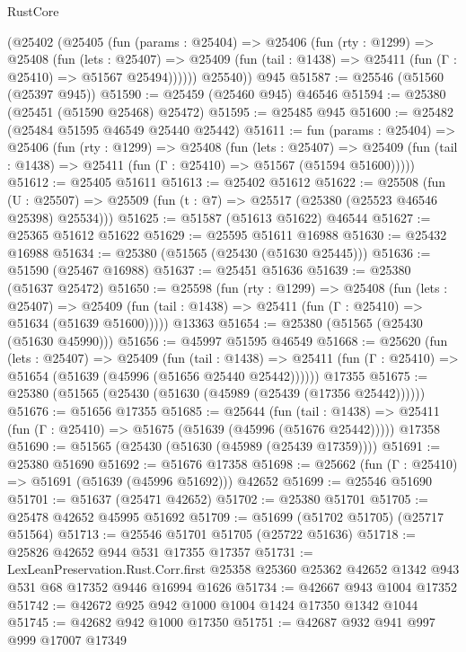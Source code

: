 \begin{lexlean}{RustCore}
\begin{coremodule}
      (@25402
        (@25405
          (fun (params : @25404) =>
          @25406
            (fun (rty : @1299) =>
            @25408
              (fun (lets : @25407) =>
              @25409 (fun (tail : @1438) => @25411 (fun (Γ : @25410) => @51567 @25494))))))
        @25540))
    @945
@51587 := @25546 (@51560 (@25397 @945))
@51590 := @25459 (@25460 @945) @46546
@51594 := @25380 (@25451 (@51590 @25468) @25472)
@51595 := @25485 @945
@51600 := @25482 (@25484 @51595 @46549 @25440 @25442)
@51611 := fun (params : @25404) =>
  @25406
    (fun (rty : @1299) =>
    @25408
      (fun (lets : @25407) =>
      @25409 (fun (tail : @1438) => @25411 (fun (Γ : @25410) => @51567 (@51594 @51600)))))
@51612 := @25405 @51611
@51613 := @25402 @51612
@51622 := @25508
    (fun (U : @25507) => @25509 (fun (t : @7) => @25517 (@25380 (@25523 @46546 @25398) @25534)))
@51625 := @51587 (@51613 @51622) @46544
@51627 := @25365 @51612 @51622
@51629 := @25595 @51611 @16988
@51630 := @25432 @16988
@51634 := @25380 (@51565 (@25430 (@51630 @25445)))
@51636 := @51590 (@25467 @16988)
@51637 := @25451 @51636
@51639 := @25380 (@51637 @25472)
@51650 := @25598
    (fun (rty : @1299) =>
    @25408
      (fun (lets : @25407) =>
      @25409 (fun (tail : @1438) => @25411 (fun (Γ : @25410) => @51634 (@51639 @51600)))))
    @13363
@51654 := @25380 (@51565 (@25430 (@51630 @45990)))
@51656 := @45997 @51595 @46549
@51668 := @25620
    (fun (lets : @25407) =>
    @25409
      (fun (tail : @1438) =>
      @25411 (fun (Γ : @25410) => @51654 (@51639 (@45996 (@51656 @25440 @25442))))))
    @17355
@51675 := @25380 (@51565 (@25430 (@51630 (@45989 (@25439 (@17356 @25442))))))
@51676 := @51656 @17355
@51685 := @25644
    (fun (tail : @1438) => @25411 (fun (Γ : @25410) => @51675 (@51639 (@45996 (@51676 @25442)))))
    @17358
@51690 := @51565 (@25430 (@51630 (@45989 (@25439 @17359))))
@51691 := @25380 @51690
@51692 := @51676 @17358
@51698 := @25662 (fun (Γ : @25410) => @51691 (@51639 (@45996 @51692))) @42652
@51699 := @25546 @51690
@51701 := @51637 (@25471 @42652)
@51702 := @25380 @51701
@51705 := @25478 @42652 @45995 @51692
@51709 := @51699 (@51702 @51705) (@25717 @51564)
@51713 := @25546 @51701 @51705 (@25722 @51636)
@51718 := @25826 @42652 @944 @531 @17355 @17357
@51731 := LexLeanPreservation.Rust.Corr.first
    @25358
    @25360
    @25362
    @42652
    @1342
    @943
    @531
    @68
    @17352
    @9446
    @16994
    @1626
@51734 := @42667 @943 @1004 @17352
@51742 := @42672 @925 @942 @1000 @1004 @1424 @17350 @1342 @1044
@51745 := @42682 @942 @1000 @17350
@51751 := @42687 @932 @941 @997 @999 @17007 @17349

\end{coremodule}
\end{lexlean}
